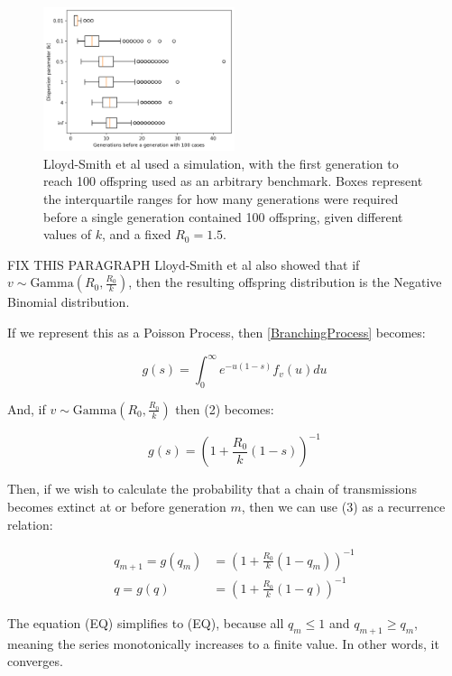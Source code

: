 \documentclass{article}
\begin{document}
\begin{figure}[h!]
    \includegraphics[width=0.5\textwidth, center]{Images/2c_firstGenerationReach100Offspring.png}
    \caption{Lloyd-Smith et al used a simulation, with the first generation to reach 100 offspring used as an arbitrary benchmark. Boxes represent the interquartile ranges for how many generations were required before a single generation contained 100 offspring, given different values of $ k $, and a fixed $ R_0=1.5 $. }\label{fig:firstGenerationToReach100Offspring}
\end{figure}

FIX THIS PARAGRAPH
Lloyd-Smith et al also showed that if $ v \sim \text{Gamma}(R_0, \frac{R_0}{k}) $, then the resulting offspring distribution is the Negative Binomial distribution. 

If we represent this as a Poisson Process, then \eqref{BranchingProcess} becomes:

\begin{equation}
    g(s) = \displaystyle \int_{0}^{\infty} e^{-u(1-s)} f_v(u) du
\end{equation}

And, if $ v \sim \text{Gamma}(R_0, \frac{R_0}{k}) $ then (2) becomes:

\begin{equation}
    g(s) = \left( 1 + \frac{R_0}{k}(1-s) \right)^{-1}
\end{equation}

Then, if we wish to calculate the probability that a chain of transmissions becomes extinct at or before generation $ m $, then we can use (3) as a recurrence relation:

\begin{align}
    q_{m+1} = g(q_{m}) &= \left( 1 + \frac{R_0}{k}(1-q_{m}) \right)^{-1} \\
    q = g(q) &= \left( 1 + \frac{R_0}{k}(1-q) \right)^{-1}
\end{align}

The equation (EQ) simplifies to (EQ), because all $ q_m \le 1 $ and $ q_{m+1} \ge q_m $, meaning the series monotonically increases to a finite value. In other words, it converges.
\end{document}

